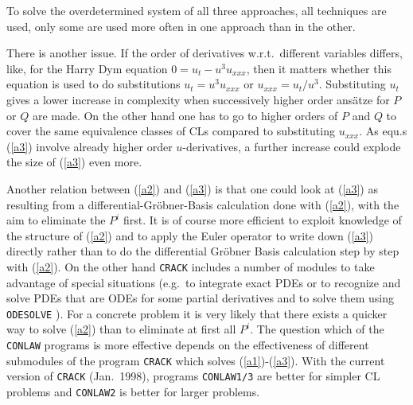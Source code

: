 To solve the overdetermined system of all three approaches, all
techniques are used, only some are used more often in one approach
than in the other.

There is another issue.
If the order of derivatives w.r.t.\ different variables differs,
like, for the Harry Dym equation $0 = u_{t} - u^3u_{xxx}$,
then it matters whether this equation is used to do substitutions
$u_{t}=u^3u_{xxx}$ or $u_{xxx}=u_{t}/u^3$. Substituting $u_{t}$
gives a lower increase in complexity when successively higher
order ans\"{a}tze for $P$ or $Q$ are made. On the other hand one
has to go to higher orders of $P$ and $Q$ to cover the
same equivalence classes of CLs compared to substituting $u_{xxx}$.
As equ.s (\ref{a3}) involve already higher order $u$-derivatives,
a further increase could explode the size of (\ref{a3}) even more.

Another relation between (\ref{a2}) and (\ref{a3}) is that one could
look at (\ref{a3}) as resulting from a differential-Gr\"{o}bner-Basis
calculation done with (\ref{a2}), with 
the aim to eliminate the $P^i$ first. It is of course more efficient to
exploit knowledge of the structure of (\ref{a2}) and to apply the Euler
operator to write down (\ref{a3}) directly rather than to do the differential
Gr\"{o}bner Basis calculation step by step with (\ref{a2}). On the other
hand {\tt CRACK} includes a number of modules to take advantage of
special situations (e.g.\ to integrate exact PDEs or to
recognize and solve PDEs that are ODEs for some partial derivatives
and to solve them using {\tt ODESOLVE} \cite{MM}).
For a concrete problem
it is very likely that there exists a quicker way to solve (\ref{a2})
than to eliminate at first all $P^i$. The question which of the
{\tt CONLAW} programs is more effective depends on the effectiveness of different
submodules of the program {\tt CRACK} which solves (\ref{a1})-(\ref{a3}).
With the current version of {\tt CRACK} (Jan.\ 1998),
programs {\tt CONLAW1/3} are better for simpler CL problems
and {\tt CONLAW2} is better for larger problems.

